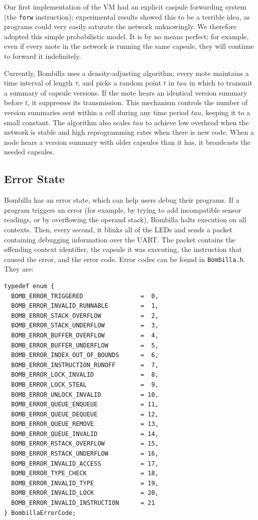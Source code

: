 \documentclass[10pt]{article}
\newcommand{\bomb}{Bombilla\xspace}
\begin{document}
Our first implementation of the VM had an explicit caspule forwarding
system (the {\tt forw} instruction); experimental results showed this
to be a terrible idea, as programs could very easily saturate the
network unknowingly. We therefore adopted this simple probabilistic
model. It is by no means perfect; for example, even if every mote in
the network is running the same capsule, they will continue to forward
it indefinitely.

Currently, \bomb uses a density-adjusting algorithm; every mote
maintains a time interval of length $\tau$, and picks a random
point $t$ in $tau$ in which to transmit a summary of capsule
versions. If the mote hears an identical version summary before
$t$, it suppresses its transmission. This mechanism controls the
number of version summaries sent within a cell during any time period
$tau$, keeping it to a small constant. The algorithm also scales
$tau$ to achieve low overhead when the network is stable and high
reprogramming rates when there is new code. When a node hears a
version summary with older capsules than it has, it broadcasts the
needed capsules.

\subsection{Error State}


\bomb has an error state, which can help users debug their
programs. If a program triggers an error (for example, by trying to
add incompatible sensor readings, or by overflowing the operand
stack), \bomb halts execution on all contexts. Then, every second, it
blinks all of the LEDs and sends a packet containing debugging
information over the UART. The packet contains the offending context
identifier, the capsule it was executing, the instruction that caused
the error, and the error code. Error codes can be found in
{\tt \bomb.h}. They are:


\begin{verbatim}
typedef enum {
  BOMB_ERROR_TRIGGERED                =  0,
  BOMB_ERROR_INVALID_RUNNABLE         =  1,
  BOMB_ERROR_STACK_OVERFLOW           =  2,
  BOMB_ERROR_STACK_UNDERFLOW          =  3, 
  BOMB_ERROR_BUFFER_OVERFLOW          =  4,
  BOMB_ERROR_BUFFER_UNDERFLOW         =  5,
  BOMB_ERROR_INDEX_OUT_OF_BOUNDS      =  6,
  BOMB_ERROR_INSTRUCTION_RUNOFF       =  7,
  BOMB_ERROR_LOCK_INVALID             =  8,
  BOMB_ERROR_LOCK_STEAL               =  9,
  BOMB_ERROR_UNLOCK_INVALID           = 10,
  BOMB_ERROR_QUEUE_ENQUEUE            = 11,
  BOMB_ERROR_QUEUE_DEQUEUE            = 12,
  BOMB_ERROR_QUEUE_REMOVE             = 13,
  BOMB_ERROR_QUEUE_INVALID            = 14,
  BOMB_ERROR_RSTACK_OVERFLOW          = 15,
  BOMB_ERROR_RSTACK_UNDERFLOW         = 16, 
  BOMB_ERROR_INVALID_ACCESS           = 17,
  BOMB_ERROR_TYPE_CHECK               = 18,
  BOMB_ERROR_INVALID_TYPE             = 19,
  BOMB_ERROR_INVALID_LOCK             = 20,
  BOMB_ERROR_INVALID_INSTRUCTION      = 21
} BombillaErrorCode;
\end{verbatim}
\end{document}
